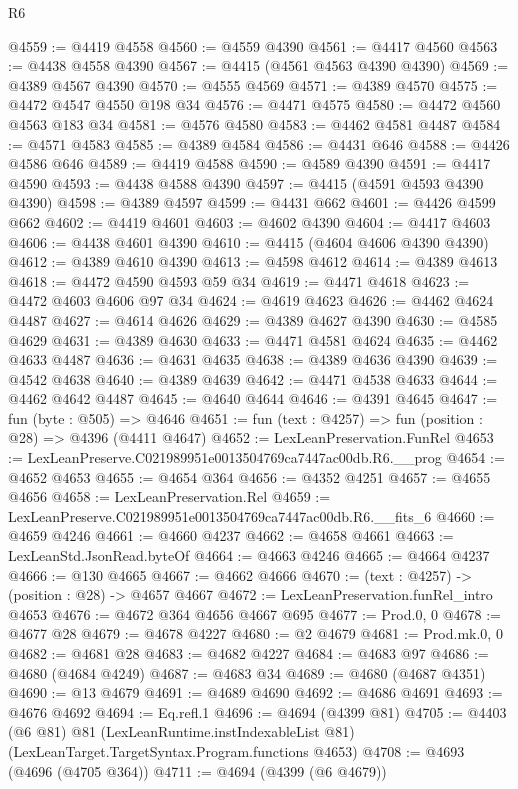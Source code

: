 \begin{lexlean}{R6}
\begin{coremodule}
@4559 := @4419 @4558
@4560 := @4559 @4390
@4561 := @4417 @4560
@4563 := @4438 @4558 @4390
@4567 := @4415 (@4561 @4563 @4390 @4390)
@4569 := @4389 @4567 @4390
@4570 := @4555 @4569
@4571 := @4389 @4570
@4575 := @4472 @4547 @4550 @198 @34
@4576 := @4471 @4575
@4580 := @4472 @4560 @4563 @183 @34
@4581 := @4576 @4580
@4583 := @4462 @4581 @4487
@4584 := @4571 @4583
@4585 := @4389 @4584
@4586 := @4431 @646
@4588 := @4426 @4586 @646
@4589 := @4419 @4588
@4590 := @4589 @4390
@4591 := @4417 @4590
@4593 := @4438 @4588 @4390
@4597 := @4415 (@4591 @4593 @4390 @4390)
@4598 := @4389 @4597
@4599 := @4431 @662
@4601 := @4426 @4599 @662
@4602 := @4419 @4601
@4603 := @4602 @4390
@4604 := @4417 @4603
@4606 := @4438 @4601 @4390
@4610 := @4415 (@4604 @4606 @4390 @4390)
@4612 := @4389 @4610 @4390
@4613 := @4598 @4612
@4614 := @4389 @4613
@4618 := @4472 @4590 @4593 @59 @34
@4619 := @4471 @4618
@4623 := @4472 @4603 @4606 @97 @34
@4624 := @4619 @4623
@4626 := @4462 @4624 @4487
@4627 := @4614 @4626
@4629 := @4389 @4627 @4390
@4630 := @4585 @4629
@4631 := @4389 @4630
@4633 := @4471 @4581 @4624
@4635 := @4462 @4633 @4487
@4636 := @4631 @4635
@4638 := @4389 @4636 @4390
@4639 := @4542 @4638
@4640 := @4389 @4639
@4642 := @4471 @4538 @4633
@4644 := @4462 @4642 @4487
@4645 := @4640 @4644
@4646 := @4391 @4645
@4647 := fun (byte : @505) => @4646
@4651 := fun (text : @4257) => fun (position : @28) => @4396 (@4411 @4647)
@4652 := LexLeanPreservation.FunRel
@4653 := LexLeanPreserve.C021989951e0013504769ca7447ac00db.R6.__prog
@4654 := @4652 @4653
@4655 := @4654 @364
@4656 := @4352 @4251
@4657 := @4655 @4656
@4658 := LexLeanPreservation.Rel
@4659 := LexLeanPreserve.C021989951e0013504769ca7447ac00db.R6.__fits_6
@4660 := @4659 @4246
@4661 := @4660 @4237
@4662 := @4658 @4661
@4663 := LexLeanStd.JsonRead.byteOf
@4664 := @4663 @4246
@4665 := @4664 @4237
@4666 := @130 @4665
@4667 := @4662 @4666
@4670 := (text : @4257) -> (position : @28) -> @4657 @4667
@4672 := LexLeanPreservation.funRel_intro @4653
@4676 := @4672 @364 @4656 @4667 @695
@4677 := Prod.{0, 0}
@4678 := @4677 @28
@4679 := @4678 @4227
@4680 := @2 @4679
@4681 := Prod.mk.{0, 0}
@4682 := @4681 @28
@4683 := @4682 @4227
@4684 := @4683 @97
@4686 := @4680 (@4684 @4249)
@4687 := @4683 @34
@4689 := @4680 (@4687 @4351)
@4690 := @13 @4679
@4691 := @4689 @4690
@4692 := @4686 @4691
@4693 := @4676 @4692
@4694 := Eq.refl.{1}
@4696 := @4694 (@4399 @81)
@4705 := @4403
    (@6 @81)
    @81
    (LexLeanRuntime.instIndexableList @81)
    (LexLeanTarget.TargetSyntax.Program.functions @4653)
@4708 := @4693 (@4696 (@4705 @364))
@4711 := @4694 (@4399 (@6 @4679))

\end{coremodule}
\end{lexlean}
